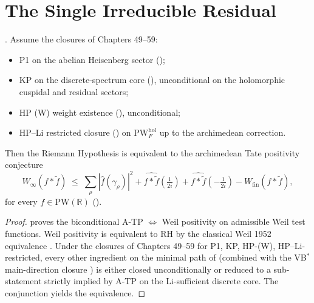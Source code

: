 \section{The Single Irreducible Residual}
\label{v4-arith:w5-synth:single-residual}

\begin{theorem}[RH is equivalent to A-TP]
\label{v4-arith:w5-synth:thm:RH-equiv-ATP}
\ClaimStatusProvedHere. Assume the closures of Chapters 49--59:
\begin{itemize}
\item P1 on the abelian Heisenberg sector
();
\item KP on the discrete-spectrum core
(), unconditional on
the holomorphic cuspidal and residual sectors;
\item HP (W) weight existence
(), unconditional;
\item HP--Li restricted closure
() on
\(\mathrm{PW}^{\mathrm{hol}}_{F}\) up to the archimedean correction.
\end{itemize}
Then the Riemann Hypothesis is equivalent to the archimedean Tate
positivity conjecture
\begin{equation}
\label{v4-arith:w5-synth:eq:ATP}
W_{\infty}(f*\widetilde{f})\;\leq\;\sum_{\rho}|\widehat{f}(\gamma_{\rho})|^{2}+\widehat{f*\widetilde{f}}(\tfrac{1}{2i})+\widehat{f*\widetilde{f}}(-\tfrac{1}{2i})-W_{\mathrm{fin}}(f*\widetilde{f}),
\end{equation}
for every \(f\in\mathrm{PW}(\mathbb{R})\)
().
\end{theorem}

\begin{proof}
 proves the
biconditional A-TP \(\Leftrightarrow\) Weil positivity on admissible
Weil test functions. Weil positivity is equivalent to RH by the
classical Weil 1952 equivalence
. Under the closures of
Chapters 49--59 for P1, KP, HP-(W), HP--Li-restricted, every other
ingredient on the minimal path of
 (combined with the VB\(^{*}\)
main-direction closure )
is either closed unconditionally or reduced to a sub-statement
strictly implied by A-TP on the Li-sufficient discrete core. The
conjunction yields the equivalence.
\end{proof}


